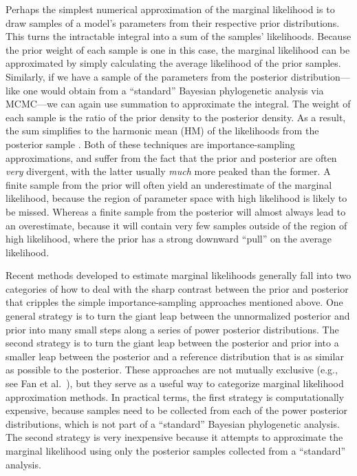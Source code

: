 Perhaps the simplest numerical approximation of the marginal likelihood is to
draw samples of a model's parameters from their respective prior distributions.
This turns the intractable integral into a sum of the samples' likelihoods.
Because the prior weight of each sample is one in this case, the marginal
likelihood can be approximated by simply calculating the average likelihood of
the prior samples.
Similarly, if we have a sample of the parameters from the posterior
distribution---like one would obtain from a ``standard'' Bayesian phylogenetic
analysis via MCMC---we can again use summation to approximate the integral.
The weight of each sample is the ratio of the prior density to the posterior
density.
As a result, the sum simplifies to the harmonic mean (HM) of the likelihoods
from the posterior sample \citep{Newton1994}.
Both of these techniques are importance-sampling approximations, and suffer
from the fact that the prior and posterior are often \emph{very} divergent,
with the latter usually \emph{much} more peaked than the former.
A finite sample from the prior will often yield an underestimate of the
marginal likelihood, because the region of parameter space with high likelihood
is likely to be missed.
Whereas a finite sample from the posterior will almost always lead to an
overestimate, because it will contain very few samples outside of the region of
high likelihood, where the prior has a strong downward ``pull'' on the average
likelihood.

Recent methods developed to estimate marginal likelihoods generally fall into
two categories of how to deal with the sharp contrast between the prior
and posterior that cripples the simple importance-sampling approaches
mentioned above.
One general strategy is to turn the giant leap between the unnormalized
posterior and prior into many small steps along a series of power posterior
distributions.
The second strategy is to turn the giant leap between the posterior and prior
into a smaller leap between the posterior and a reference distribution that is
as similar as possible to the posterior.
These approaches are not mutually exclusive (e.g., see Fan et al.\
\citeyear{Fan2011}), but they serve as a useful way to categorize marginal
likelihood approximation methods.
In practical terms, the first strategy is computationally expensive, because
samples need to be collected from each of the power posterior distributions,
which is not part of a ``standard'' Bayesian phylogenetic analysis.
The second strategy is very inexpensive because it attempts to approximate the
marginal likelihood using only the posterior samples collected from a
``standard'' analysis.

